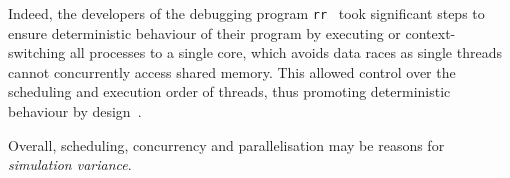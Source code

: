 \DIFdelend Indeed, the developers of the debugging program \texttt{rr}~\cite{RR_link} took significant steps to ensure deterministic behaviour of their program by executing or context-switching all processes to a single core, which avoids data races as single threads cannot concurrently access shared memory. This allowed control over the scheduling and execution order of threads, thus promoting deterministic behaviour by design~\cite{acm-q-rr-interview}.
\DIFdelbegin %

\DIFdelend 

Overall, scheduling, concurrency and parallelisation may be reasons for \textit{simulation variance}. 





\DIFaddbegin 



